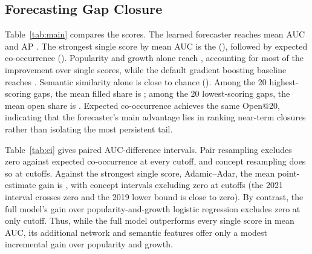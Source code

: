 \documentclass[runningheads]{llncs}
\begin{document}
\subsection{Forecasting Gap Closure}

\begin{table}[t]
\centering
\caption{Forecasting which gaps are filled within three years ($m{=}50$, $g{=}0$, $k{=}3$, $H{=}3$). Higher is better for every column. P@20: share filled among the 20 top-ranked gaps; Open@20: share still open among the 20 lowest-ranked gaps.}
\label{tab:main}
\small
\setlength{\tabcolsep}{3pt}
\resizebox{\textwidth}{!}{}
\end{table}

Table~\ref{tab:main} compares the scores. The learned forecaster reaches mean AUC \learnedAUC{} and AP \learnedAP{}. The strongest single score by mean AUC is the \bestBaseName{} (\bestBaseAUC{}), followed by expected co-occurrence (\expectedAUC{}). Popularity and growth alone reach \lrpgAUC{}, accounting for most of the improvement over single scores, while the default gradient boosting baseline reaches \gbmAUC{}. Semantic similarity alone is close to chance (\semanticAUC{}). Among the 20 highest-scoring gaps, the mean filled share is \learnedPtw{}; among the 20 lowest-scoring gaps, the mean open share is \learnedOpen{}. Expected co-occurrence achieves the same Open@20, indicating that the forecaster's main advantage lies in ranking near-term closures rather than isolating the most persistent tail.

\begin{table}[t]
\centering
\caption{Pointwise 95\% bootstrap intervals for learned AUC minus comparator AUC at each cutoff. Concept resampling assigns pair weights from shared endpoint multiplicities.}
\label{tab:ci}
\footnotesize
\setlength{\tabcolsep}{4pt}

\end{table}

Table~\ref{tab:ci} gives paired AUC-difference intervals. Pair resampling excludes zero against expected co-occurrence at every cutoff, and concept resampling does so at \ciClExpExcludeW{} cutoffs. Against the strongest single score, Adamic--Adar, the mean point-estimate gain is \aaGain{}, with concept intervals excluding zero at \ciClAaExcludeW{} cutoffs (the 2021 interval crosses zero and the 2019 lower bound is close to zero). By contrast, the full model's gain over popularity-and-growth logistic regression excludes zero at only \ciClLrpgExcludeW{} cutoff. Thus, while the full model outperforms every single score in mean AUC, its additional network and semantic features offer only a modest incremental gain over popularity and growth.
\end{document}
